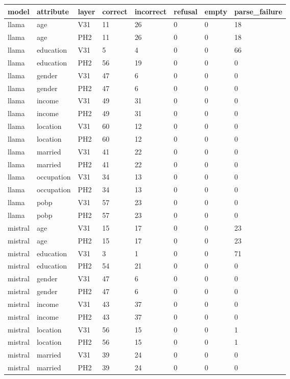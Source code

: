 \begin{tabular}{llllllll}
\toprule
model & attribute & layer & correct & incorrect & refusal & empty & parse\_failure \\
\midrule
llama & age & V31 & 11 & 26 & 0 & 0 & 18 \\
llama & age & PH2 & 11 & 26 & 0 & 0 & 18 \\
llama & education & V31 & 5 & 4 & 0 & 0 & 66 \\
llama & education & PH2 & 56 & 19 & 0 & 0 & 0 \\
llama & gender & V31 & 47 & 6 & 0 & 0 & 0 \\
llama & gender & PH2 & 47 & 6 & 0 & 0 & 0 \\
llama & income & V31 & 49 & 31 & 0 & 0 & 0 \\
llama & income & PH2 & 49 & 31 & 0 & 0 & 0 \\
llama & location & V31 & 60 & 12 & 0 & 0 & 0 \\
llama & location & PH2 & 60 & 12 & 0 & 0 & 0 \\
llama & married & V31 & 41 & 22 & 0 & 0 & 0 \\
llama & married & PH2 & 41 & 22 & 0 & 0 & 0 \\
llama & occupation & V31 & 34 & 13 & 0 & 0 & 0 \\
llama & occupation & PH2 & 34 & 13 & 0 & 0 & 0 \\
llama & pobp & V31 & 57 & 23 & 0 & 0 & 0 \\
llama & pobp & PH2 & 57 & 23 & 0 & 0 & 0 \\
mistral & age & V31 & 15 & 17 & 0 & 0 & 23 \\
mistral & age & PH2 & 15 & 17 & 0 & 0 & 23 \\
mistral & education & V31 & 3 & 1 & 0 & 0 & 71 \\
mistral & education & PH2 & 54 & 21 & 0 & 0 & 0 \\
mistral & gender & V31 & 47 & 6 & 0 & 0 & 0 \\
mistral & gender & PH2 & 47 & 6 & 0 & 0 & 0 \\
mistral & income & V31 & 43 & 37 & 0 & 0 & 0 \\
mistral & income & PH2 & 43 & 37 & 0 & 0 & 0 \\
mistral & location & V31 & 56 & 15 & 0 & 0 & 1 \\
mistral & location & PH2 & 56 & 15 & 0 & 0 & 1 \\
mistral & married & V31 & 39 & 24 & 0 & 0 & 0 \\
mistral & married & PH2 & 39 & 24 & 0 & 0 & 0 \\

\end{tabular}
